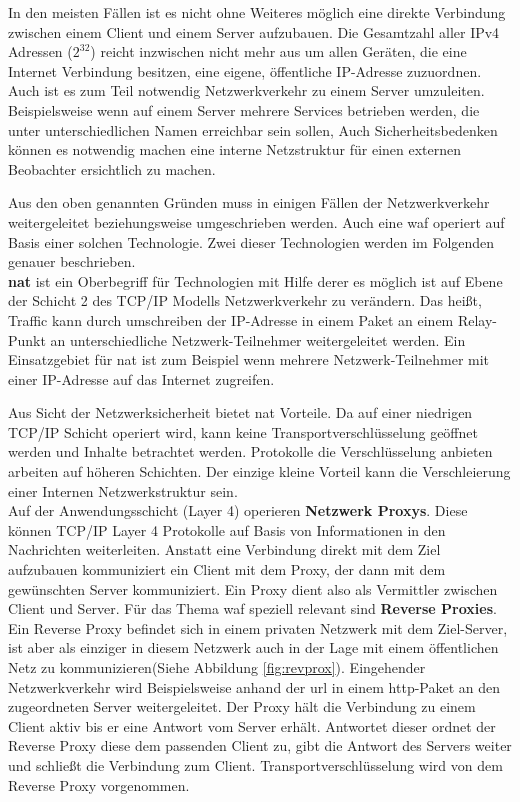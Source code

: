 In den meisten Fällen ist es nicht ohne Weiteres möglich eine direkte Verbindung zwischen einem Client und einem Server aufzubauen.
Die Gesamtzahl aller IPv4 Adressen ($2^{32}$) reicht inzwischen nicht mehr aus um allen Geräten, die eine Internet Verbindung besitzen, eine eigene, öffentliche IP-Adresse zuzuordnen.
Auch ist es zum Teil notwendig Netzwerkverkehr zu einem Server umzuleiten.
Beispielsweise wenn auf einem Server mehrere Services betrieben werden, die unter unterschiedlichen Namen erreichbar sein sollen,
Auch Sicherheitsbedenken können es notwendig machen eine interne Netzstruktur für einen externen Beobachter ersichtlich zu machen.

Aus den oben genannten Gründen muss in einigen Fällen der Netzwerkverkehr weitergeleitet beziehungsweise umgeschrieben werden.
Auch eine \ac{waf} operiert auf Basis einer solchen Technologie.
Zwei dieser Technologien werden im Folgenden genauer beschrieben.\\

\textbf{\ac{nat}} ist ein Oberbegriff für Technologien mit Hilfe derer es möglich ist auf Ebene der Schicht 2 des TCP/IP Modells Netzwerkverkehr zu verändern.
Das heißt, Traffic kann durch umschreiben der IP-Adresse in einem Paket an einem Relay-Punkt an unterschiedliche Netzwerk-Teilnehmer weitergeleitet werden.
Ein Einsatzgebiet für \ac{nat} ist zum Beispiel wenn mehrere Netzwerk-Teilnehmer mit einer IP-Adresse auf das Internet zugreifen.

Aus Sicht der Netzwerksicherheit bietet \ac{nat} Vorteile.
Da auf einer niedrigen TCP/IP Schicht operiert wird, kann keine Transportverschlüsselung geöffnet werden und Inhalte betrachtet werden.
Protokolle die Verschlüsselung anbieten arbeiten auf höheren Schichten.
Der einzige kleine Vorteil kann die Verschleierung einer Internen Netzwerkstruktur sein\cite{NATNetworkAddress}.\\

Auf der Anwendungsschicht (Layer 4) operieren \textbf{Netzwerk Proxys}.
Diese können TCP/IP Layer 4 Protokolle auf Basis von Informationen in den Nachrichten weiterleiten.
Anstatt eine Verbindung direkt mit dem Ziel aufzubauen kommuniziert ein Client mit dem Proxy, der dann mit dem gewünschten Server kommuniziert.
Ein Proxy dient also als Vermittler zwischen Client und Server.
Für das Thema \ac{waf} speziell relevant sind \textbf{Reverse Proxies}.
Ein Reverse Proxy befindet sich in einem privaten Netzwerk mit dem Ziel-Server, ist aber als einziger in diesem Netzwerk auch in der Lage mit einem öffentlichen Netz zu kommunizieren(Siehe Abbildung \ref{fig:revprox}).
Eingehender Netzwerkverkehr wird Beispielsweise anhand der \ac{url} in einem \ac{http}-Paket an den zugeordneten Server weitergeleitet.
Der Proxy hält die Verbindung zu einem Client aktiv bis er eine Antwort vom Server erhält.
Antwortet dieser ordnet der Reverse Proxy diese dem passenden Client zu, gibt die Antwort des Servers weiter und schließt die Verbindung zum Client.
Transportverschlüsselung wird von dem Reverse Proxy vorgenommen.

